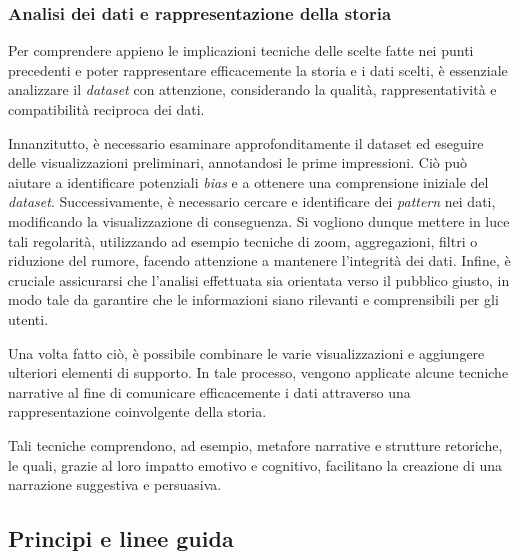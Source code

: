 \subsubsection{Analisi dei dati e rappresentazione della storia}
Per comprendere appieno le implicazioni tecniche delle scelte fatte nei punti precedenti e poter rappresentare efficacemente la storia e i dati scelti, è 
essenziale analizzare il \emph{dataset} con attenzione, considerando la qualità, rappresentatività e compatibilità reciproca dei dati.

Innanzitutto, è necessario esaminare approfonditamente il dataset ed eseguire delle visualizzazioni preliminari, annotandosi le prime impressioni.
Ciò può aiutare a identificare potenziali \emph{bias} e a ottenere una comprensione iniziale del \emph{dataset}. 
Successivamente, è necessario cercare e identificare dei \emph{pattern} nei dati, modificando la visualizzazione di conseguenza. 
Si vogliono dunque mettere in luce tali regolarità, utilizzando ad esempio tecniche di zoom, aggregazioni, filtri o riduzione del rumore, facendo attenzione a mantenere l'integrità dei dati. 
Infine, è cruciale assicurarsi che l'analisi effettuata sia orientata verso il pubblico giusto, in modo tale da garantire che le informazioni siano rilevanti e comprensibili per gli utenti.

\bigskip
\noindent Una volta fatto ciò, è possibile combinare le varie visualizzazioni e aggiungere ulteriori elementi di supporto.
In tale processo, vengono applicate alcune tecniche narrative al fine di comunicare efficacemente i dati attraverso una rappresentazione coinvolgente della storia.

Tali tecniche comprendono, ad esempio, metafore narrative e strutture retoriche, le quali, grazie al loro impatto emotivo e cognitivo, facilitano la creazione di una narrazione suggestiva e persuasiva.


\subsection{Principi e linee guida}
